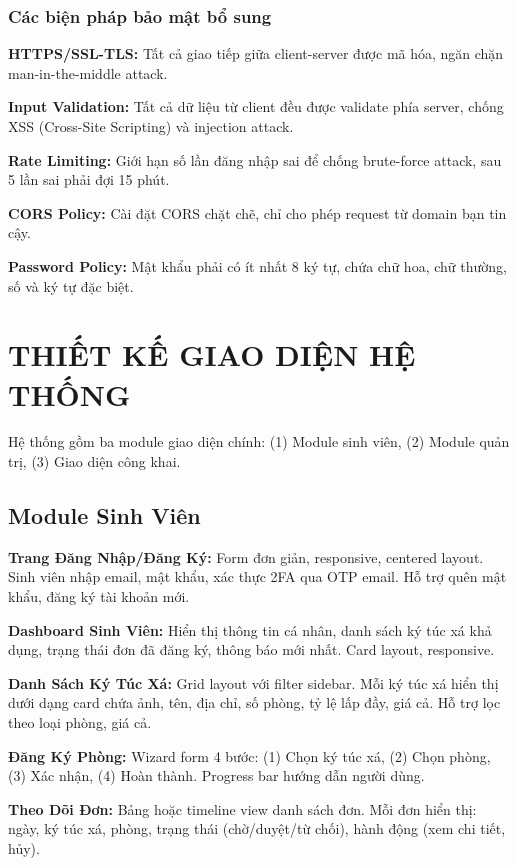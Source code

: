 \documentclass[12pt,a4paper]{article}
\begin{document}
\subsubsection{Các biện pháp bảo mật bổ sung}

\textbf{HTTPS/SSL-TLS:} Tất cả giao tiếp giữa client-server được mã hóa, ngăn chặn man-in-the-middle attack.

\textbf{Input Validation:} Tất cả dữ liệu từ client đều được validate phía server, chống XSS (Cross-Site Scripting) và injection attack.

\textbf{Rate Limiting:} Giới hạn số lần đăng nhập sai để chống brute-force attack, sau 5 lần sai phải đợi 15 phút.

\textbf{CORS Policy:} Cài đặt CORS chặt chẽ, chỉ cho phép request từ domain bạn tin cậy.

\textbf{Password Policy:} Mật khẩu phải có ít nhất 8 ký tự, chứa chữ hoa, chữ thường, số và ký tự đặc biệt.

\newpage
\section{THIẾT KẾ GIAO DIỆN HỆ THỐNG}

Hệ thống gồm ba module giao diện chính: (1) Module sinh viên, (2) Module quản trị, (3) Giao diện công khai.

\subsection{Module Sinh Viên}

\textbf{Trang Đăng Nhập/Đăng Ký:} Form đơn giản, responsive, centered layout. Sinh viên nhập email, mật khẩu, xác thực 2FA qua OTP email. Hỗ trợ quên mật khẩu, đăng ký tài khoản mới.

\textbf{Dashboard Sinh Viên:} Hiển thị thông tin cá nhân, danh sách ký túc xá khả dụng, trạng thái đơn đã đăng ký, thông báo mới nhất. Card layout, responsive.

\textbf{Danh Sách Ký Túc Xá:} Grid layout với filter sidebar. Mỗi ký túc xá hiển thị dưới dạng card chứa ảnh, tên, địa chỉ, số phòng, tỷ lệ lấp đầy, giá cả. Hỗ trợ lọc theo loại phòng, giá cả.

\textbf{Đăng Ký Phòng:} Wizard form 4 bước: (1) Chọn ký túc xá, (2) Chọn phòng, (3) Xác nhận, (4) Hoàn thành. Progress bar hướng dẫn người dùng.

\textbf{Theo Dõi Đơn:} Bảng hoặc timeline view danh sách đơn. Mỗi đơn hiển thị: ngày, ký túc xá, phòng, trạng thái (chờ/duyệt/từ chối), hành động (xem chi tiết, hủy).
\end{document}
